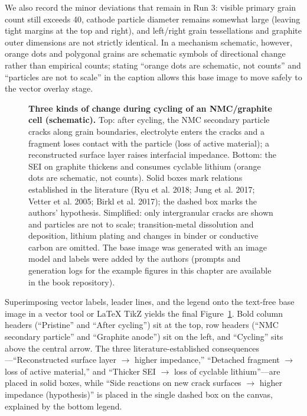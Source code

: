 We also record the minor deviations that remain in Run 3: visible primary grain count still exceeds 40, cathode particle diameter remains somewhat large (leaving tight margins at the top and right), and left/right grain tessellations and graphite outer dimensions are not strictly identical. In a mechanism schematic, however, orange dots and polygonal grains are schematic symbols of directional change rather than empirical counts; stating ``orange dots are schematic, not counts'' and ``particles are not to scale'' in the caption allows this base image to move safely to the vector overlay stage.

\begin{figure}[htbp]\centering
\makebox[\linewidth][c]{}
\caption{\textbf{Three kinds of change during cycling of an NMC/graphite cell (schematic).} Top: after cycling, the NMC secondary particle cracks along grain boundaries, electrolyte enters the cracks and a fragment loses contact with the particle (loss of active material); a reconstructed surface layer raises interfacial impedance. Bottom: the SEI on graphite thickens and consumes cyclable lithium (orange dots are schematic, not counts). Solid boxes mark relations established in the literature (Ryu et al. 2018; Jung et al. 2017; Vetter et al. 2005; Birkl et al. 2017); the dashed box marks the authors' hypothesis. Simplified: only intergranular cracks are shown and particles are not to scale; transition-metal dissolution and deposition, lithium plating and changes in binder or conductive carbon are omitted. The base image was generated with an image model and labels were added by the authors (prompts and generation logs for the example figures in this chapter are available in the book repository).}\label{fig:ch02-06}
\end{figure}

Superimposing vector labels, leader lines, and the legend onto the text-free base image in a vector tool or LaTeX TikZ yields the final Figure~\ref{fig:ch02-06}. Bold column headers (``Pristine'' and ``After cycling'') sit at the top, row headers (``NMC secondary particle'' and ``Graphite anode'') sit on the left, and ``Cycling'' sits above the central arrow. The three literature-established consequences---``Reconstructed surface layer \ensuremath{\rightarrow} higher impedance,'' ``Detached fragment \ensuremath{\rightarrow} loss of active material,'' and ``Thicker SEI \ensuremath{\rightarrow} loss of cyclable lithium''---are placed in solid boxes, while ``Side reactions on new crack surfaces \ensuremath{\rightarrow} higher impedance (hypothesis)'' is placed in the single dashed box on the canvas, explained by the bottom legend.

